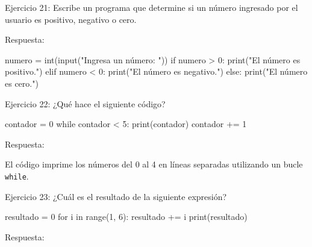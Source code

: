 \documentclass[
  a4paper,
  DIV=11,
  numbers=noendperiod,
  onepage,
  openany]{scrreprt}
\newenvironment{Shaded}{\begin{snugshade}}{\end{snugshade}}
\newcommand{\BuiltInTok}[1]{\textcolor[rgb]{0.00,0.23,0.31}{#1}}
\newcommand{\ControlFlowTok}[1]{\textcolor[rgb]{0.00,0.23,0.31}{#1}}
\newcommand{\DecValTok}[1]{\textcolor[rgb]{0.68,0.00,0.00}{#1}}
\newcommand{\KeywordTok}[1]{\textcolor[rgb]{0.00,0.23,0.31}{#1}}
\newcommand{\NormalTok}[1]{\textcolor[rgb]{0.00,0.23,0.31}{#1}}
\newcommand{\OperatorTok}[1]{\textcolor[rgb]{0.37,0.37,0.37}{#1}}
\newcommand{\StringTok}[1]{\textcolor[rgb]{0.13,0.47,0.30}{#1}}
\begin{document}
Ejercicio 21: Escribe un programa que determine si un número ingresado
por el usuario es positivo, negativo o cero.

Respuesta:

\begin{Shaded}
\begin{Highlighting}[]
\NormalTok{numero }\OperatorTok{=} \BuiltInTok{int}\NormalTok{(}\BuiltInTok{input}\NormalTok{(}\StringTok{"Ingresa un número: "}\NormalTok{))}
\ControlFlowTok{if}\NormalTok{ numero }\OperatorTok{\textgreater{}} \DecValTok{0}\NormalTok{:}
    \BuiltInTok{print}\NormalTok{(}\StringTok{"El número es positivo."}\NormalTok{)}
\ControlFlowTok{elif}\NormalTok{ numero }\OperatorTok{\textless{}} \DecValTok{0}\NormalTok{:}
    \BuiltInTok{print}\NormalTok{(}\StringTok{"El número es negativo."}\NormalTok{)}
\ControlFlowTok{else}\NormalTok{:}
    \BuiltInTok{print}\NormalTok{(}\StringTok{"El número es cero."}\NormalTok{)}
\end{Highlighting}
\end{Shaded}

Ejercicio 22: ¿Qué hace el siguiente código?

\begin{Shaded}
\begin{Highlighting}[]
\NormalTok{contador }\OperatorTok{=} \DecValTok{0}
\ControlFlowTok{while}\NormalTok{ contador }\OperatorTok{\textless{}} \DecValTok{5}\NormalTok{:}
    \BuiltInTok{print}\NormalTok{(contador)}
\NormalTok{    contador }\OperatorTok{+=} \DecValTok{1}
\end{Highlighting}
\end{Shaded}

Respuesta:

El código imprime los números del 0 al 4 en líneas separadas utilizando
un bucle \texttt{while}.

Ejercicio 23: ¿Cuál es el resultado de la siguiente expresión?

\begin{Shaded}
\begin{Highlighting}[]
\NormalTok{resultado }\OperatorTok{=} \DecValTok{0}
\ControlFlowTok{for}\NormalTok{ i }\KeywordTok{in} \BuiltInTok{range}\NormalTok{(}\DecValTok{1}\NormalTok{, }\DecValTok{6}\NormalTok{):}
\NormalTok{    resultado }\OperatorTok{+=}\NormalTok{ i}
\BuiltInTok{print}\NormalTok{(resultado)}
\end{Highlighting}
\end{Shaded}

Respuesta:
\end{document}
